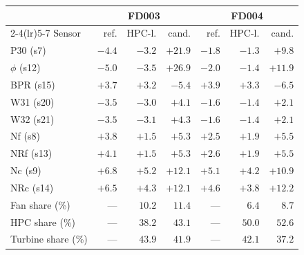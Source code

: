 \begin{tabular}{@{}lrrrrrr@{}}
\toprule
 & \multicolumn{3}{c}{FD003} & \multicolumn{3}{c}{FD004} \\
\cmidrule(lr){2-4}\cmidrule(lr){5-7}
Sensor & ref. & HPC-l. & cand. & ref. & HPC-l. & cand. \\
\midrule
P30 (s7) & $-4.4$ & $-3.2$ & $+21.9$ & $-1.8$ & $-1.3$ & $+9.8$ \\
$\phi$ (s12) & $-5.0$ & $-3.5$ & $+26.9$ & $-2.0$ & $-1.4$ & $+11.9$ \\
BPR (s15) & $+3.7$ & $+3.2$ & $-5.4$ & $+3.9$ & $+3.3$ & $-6.5$ \\
W31 (s20) & $-3.5$ & $-3.0$ & $+4.1$ & $-1.6$ & $-1.4$ & $+2.1$ \\
W32 (s21) & $-3.5$ & $-3.1$ & $+4.3$ & $-1.6$ & $-1.4$ & $+2.1$ \\
Nf (s8) & $+3.8$ & $+1.5$ & $+5.3$ & $+2.5$ & $+1.9$ & $+5.5$ \\
NRf (s13) & $+4.1$ & $+1.5$ & $+5.3$ & $+2.6$ & $+1.9$ & $+5.5$ \\
Nc (s9) & $+6.8$ & $+5.2$ & $+12.1$ & $+5.1$ & $+4.2$ & $+10.9$ \\
NRc (s14) & $+6.5$ & $+4.3$ & $+12.1$ & $+4.6$ & $+3.8$ & $+12.2$ \\
\midrule
Fan share (\%) & --- & $10.2$ & $11.4$ & --- & $6.4$ & $8.7$ \\
HPC share (\%) & --- & $38.2$ & $43.1$ & --- & $50.0$ & $52.6$ \\
Turbine share (\%) & --- & $43.9$ & $41.9$ & --- & $42.1$ & $37.2$ \\
\bottomrule
\end{tabular}
